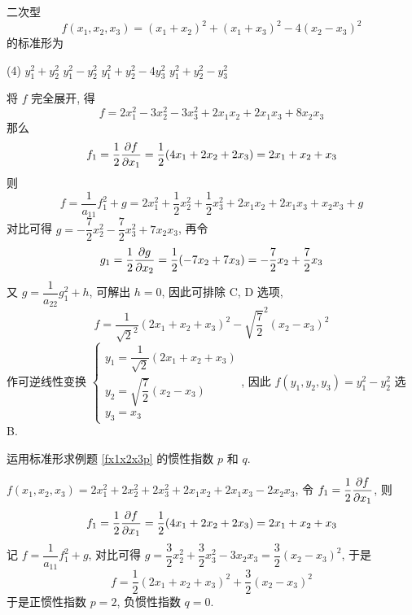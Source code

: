 \begin{example}
    二次型 $$f(x_1,x_2,x_3)=(x_1+x_2)^2+(x_1+x_3)^2-4(x_2-x_3)^2$$ 的标准形为
    \begin{tasks}(4)
        \task $y_1^2+y_2^2$
        \task $y_1^2-y_2^2$
        \task $y_1^2+y_2^2-4y_3^2$
        \task $y_1^2+y_2^2-y_3^2$
    \end{tasks}
\end{example}
\begin{solution}
    将 $f$ 完全展开, 得 $$f=2x_1^2-3x_2^2-3x_3^2+2x_1x_2+2x_1x_3+8x_2x_3$$
    那么 $$f_1=\dfrac{1}{2}\pdv{f}{x_1}=\dfrac{1}{2}(4x_1+2x_2+2x_3)=2x_1+x_2+x_3$$
    则 $$f=\dfrac{1}{a_{11}}f_1^2+g=2x_1^2+\dfrac{1}{2}x_2^2+\dfrac{1}{2}x_3^2+2x_1x_2+2x_1x_3+x_2x_3+g$$
    对比可得 $g=-\dfrac{7}{2}x_2^2-\dfrac{7}{2}x_3^2+7x_2x_3$, 
    再令 $$g_1=\dfrac{1}{2}\pdv{g}{x_2}=\dfrac{1}{2}(-7x_2+7x_3)=-\dfrac{7}{2}x_2+\dfrac{7}{2}x_3$$
    又 $g=\dfrac{1}{a_{22}}g_1^2+h$, 可解出 $h=0$, 因此可排除 C, D 选项, 
    $$f=\dfrac{1}{\sqrt{2}^2}(2x_1+x_2+x_3)^2-\sqrt{\dfrac{7}{2}}^2(x_2-x_3)^2$$
    作可逆线性变换 $\begin{cases}
            y_1=\dfrac{1}{\sqrt{2}} (2x_1+x_2+x_3) \\[6pt]
            y_2=\sqrt{\dfrac{7}{2} } (x_2-x_3)     \\[6pt]
            y_3=x_3
        \end{cases}$, 因此 $f(y_1,y_2,y_3)=y_1^2-y_2^2$ 选 B.
\end{solution}

\begin{example}
    运用标准形求例题 \ref{fx1x2x3p} 的惯性指数 $p$ 和 $q$.
\end{example}
\begin{solution}
    $f(x_1,x_2,x_3)=2x_1^2+2x_2^2+2x_3^2+2x_1x_2+2x_1x_3-2x_2x_3$, 令 $f_1=\dfrac{1}{2}\displaystyle\pdv{f}{x_1}$, 则 $$f_1=\dfrac{1}{2}\pdv{f}{x_1}=\dfrac{1}{2}(4x_1+2x_2+2x_3)=2x_1+x_2+x_3$$
    记 $f=\dfrac{1}{a_{11}}f_1^2+g$, 对比可得 $g=\dfrac{3}{2}x_2^2+\dfrac{3}{2}x_3^2-3x_2x_3=\dfrac{3}{2}(x_2-x_3)^2$, 于是 $$f=\dfrac{1}{2}(2x_1+x_2+x_3)^2+\dfrac{3}{2}(x_2-x_3)^2$$
    于是正惯性指数 $p=2$, 负惯性指数 $q=0.$
\end{solution}
